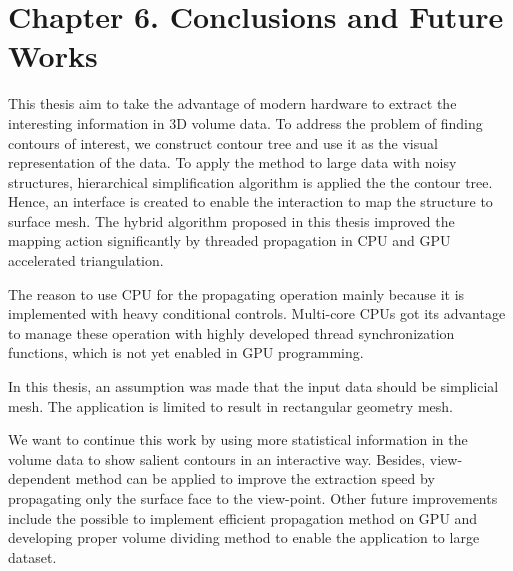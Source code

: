 \documentclass[11pt, b5paper]{report}
\begin{document}



% 
\chapter*{Chapter 6. Conclusions and Future Works}
\setcounter{tocdepth}{0}
\setcounter{chapter}{6}
\setcounter{section}{0}
\label{ch:conc}

This thesis aim to take the advantage of modern hardware to extract the 
interesting information in 3D volume data. To address the problem of finding
contours of interest, we construct contour tree and use it as the visual 
representation of the data. To apply the method to large data with noisy 
structures, hierarchical simplification algorithm is applied the the 
contour tree. Hence, an interface is created to enable the interaction 
to map the structure to surface mesh. The hybrid algorithm proposed 
in this thesis improved the mapping action significantly 
by threaded propagation in CPU and GPU accelerated triangulation.

The reason to use CPU for the propagating operation mainly because it is 
implemented with heavy conditional controls. Multi-core CPUs got its
advantage to manage these operation with highly developed thread 
synchronization functions, which is not yet enabled in GPU programming.


In this thesis, an assumption was made that the input data should 
be simplicial mesh. The application is limited to result in rectangular
geometry mesh.

We want to continue this work by using more statistical information in the 
volume data to show salient contours in an interactive way. Besides, 
view-dependent method can be applied to improve the extraction speed 
by propagating only the surface face to the view-point. Other future
improvements include the possible to implement efficient propagation
method on GPU and developing proper volume dividing method to enable
the application to large dataset.

\end{document}
